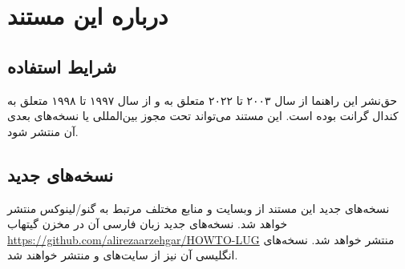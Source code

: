 \section{درباره این مستند}

\subsection{شرایط استفاده}

حق‌نشر این راهنما از سال ۲۰۰۳ تا ۲۰۲۲ متعلق به
و از سال ۱۹۹۷ تا ۱۹۹۸ متعلق به
کندال گرانت
بوده است.
این مستند می‌تواند تحت مجوز بین‌المللی
یا نسخه‌های بعدی آن منتشر شود.

\subsection{نسخه‌های جدید}

نسخه‌های جدید این مستند از وبسایت و منابع مختلف مرتبط به گنو/لینوکس منتشر خواهد شد.
نسخه‌های جدید زبان فارسی آن در مخزن گیتهاب
\url{https://github.com/alirezaarzehgar/HOWTO-LUG}
منتشر خواهد شد.
نسخه‌های انگلیسی آن نیز از سایت‌های
و
منتشر خواهند شد.

